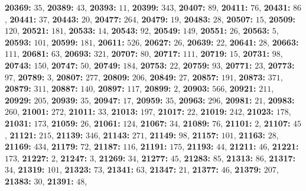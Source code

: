 \textsf{\bfseries 20369:} $35$, \textsf{\bfseries 20389:} $43$, \textsf{\bfseries 20393:} $11$, \textsf{\bfseries 20399:} $343$, \textsf{\bfseries 20407:} $89$, \textsf{\bfseries 20411:} $76$, \textsf{\bfseries 20431:} $86$, \textsf{\bfseries 20441:} $37$, \textsf{\bfseries 20443:} $20$, \textsf{\bfseries 20477:} $264$, \textsf{\bfseries 20479:} $19$, \textsf{\bfseries 20483:} $28$, \textsf{\bfseries 20507:} $15$, \textsf{\bfseries 20509:} $120$, \textsf{\bfseries 20521:} $181$, \textsf{\bfseries 20533:} $14$, \textsf{\bfseries 20543:} $92$, \textsf{\bfseries 20549:} $149$, \textsf{\bfseries 20551:} $26$, \textsf{\bfseries 20563:} $5$, \textsf{\bfseries 20593:} $101$, \textsf{\bfseries 20599:} $181$, \textsf{\bfseries 20611:} $526$, \textsf{\bfseries 20627:} $26$, \textsf{\bfseries 20639:} $22$, \textsf{\bfseries 20641:} $28$, \textsf{\bfseries 20663:} $111$, \textsf{\bfseries 20681:} $63$, \textsf{\bfseries 20693:} $321$, \textsf{\bfseries 20707:} $80$, \textsf{\bfseries 20717:} $111$, \textsf{\bfseries 20719:} $15$, \textsf{\bfseries 20731:} $98$, \textsf{\bfseries 20743:} $150$, \textsf{\bfseries 20747:} $50$, \textsf{\bfseries 20749:} $184$, \textsf{\bfseries 20753:} $22$, \textsf{\bfseries 20759:} $93$, \textsf{\bfseries 20771:} $23$, \textsf{\bfseries 20773:} $97$, \textsf{\bfseries 20789:} $3$, \textsf{\bfseries 20807:} $277$, \textsf{\bfseries 20809:} $206$, \textsf{\bfseries 20849:} $27$, \textsf{\bfseries 20857:} $191$, \textsf{\bfseries 20873:} $371$, \textsf{\bfseries 20879:} $311$, \textsf{\bfseries 20887:} $140$, \textsf{\bfseries 20897:} $117$, \textsf{\bfseries 20899:} $2$, \textsf{\bfseries 20903:} $566$, \textsf{\bfseries 20921:} $211$, \textsf{\bfseries 20929:} $205$, \textsf{\bfseries 20939:} $35$, \textsf{\bfseries 20947:} $17$, \textsf{\bfseries 20959:} $35$, \textsf{\bfseries 20963:} $296$, \textsf{\bfseries 20981:} $21$, \textsf{\bfseries 20983:} $260$, \textsf{\bfseries 21001:} $272$, \textsf{\bfseries 21011:} $33$, \textsf{\bfseries 21013:} $197$, \textsf{\bfseries 21017:} $22$, \textsf{\bfseries 21019:} $242$, \textsf{\bfseries 21023:} $178$, \textsf{\bfseries 21031:} $173$, \textsf{\bfseries 21059:} $26$, \textsf{\bfseries 21061:} $124$, \textsf{\bfseries 21067:} $34$, \textsf{\bfseries 21089:} $76$, \textsf{\bfseries 21101:} $2$, \textsf{\bfseries 21107:} $45$, \textsf{\bfseries 21121:} $215$, \textsf{\bfseries 21139:} $346$, \textsf{\bfseries 21143:} $271$, \textsf{\bfseries 21149:} $98$, \textsf{\bfseries 21157:} $101$, \textsf{\bfseries 21163:} $28$, \textsf{\bfseries 21169:} $434$, \textsf{\bfseries 21179:} $72$, \textsf{\bfseries 21187:} $116$, \textsf{\bfseries 21191:} $175$, \textsf{\bfseries 21193:} $44$, \textsf{\bfseries 21211:} $46$, \textsf{\bfseries 21221:} $173$, \textsf{\bfseries 21227:} $2$, \textsf{\bfseries 21247:} $3$, \textsf{\bfseries 21269:} $34$, \textsf{\bfseries 21277:} $45$, \textsf{\bfseries 21283:} $85$, \textsf{\bfseries 21313:} $86$, \textsf{\bfseries 21317:} $34$, \textsf{\bfseries 21319:} $101$, \textsf{\bfseries 21323:} $73$, \textsf{\bfseries 21341:} $63$, \textsf{\bfseries 21347:} $21$, \textsf{\bfseries 21377:} $46$, \textsf{\bfseries 21379:} $207$, \textsf{\bfseries 21383:} $30$, \textsf{\bfseries 21391:} $48$, 
